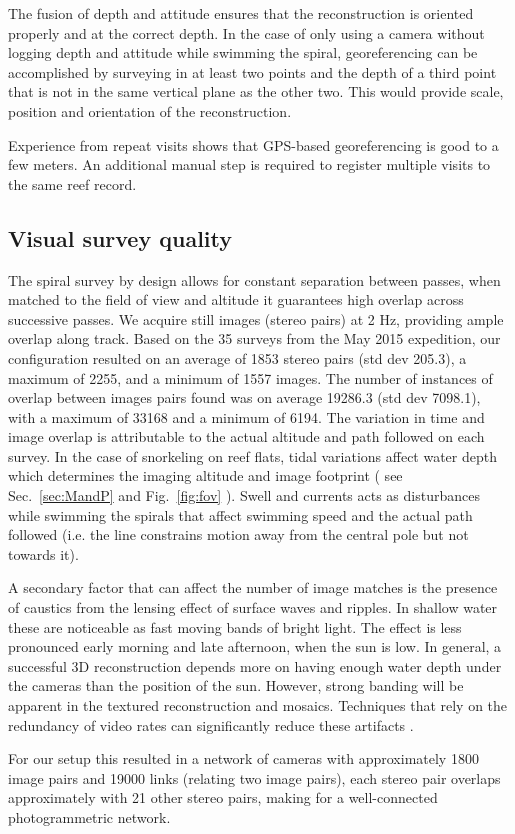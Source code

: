 The fusion of depth and attitude ensures that the reconstruction is oriented properly and at the correct depth. In the case of only using a camera without logging depth and attitude while swimming the spiral, georeferencing can be accomplished by surveying in at least two points and the depth of a third point that is not in the same vertical plane as the other two. This would provide scale, position and orientation of the reconstruction.

Experience from repeat visits shows that GPS-based georeferencing is good to a few meters. An additional manual step is required to register multiple visits to the same reef record.

\subsection{Visual survey quality}
The spiral survey by design allows for constant separation between passes, when matched to the field of view and altitude it guarantees high overlap across successive passes. We acquire still images (stereo pairs) at 2 Hz, providing ample overlap along track. Based on the 35 surveys from the May 2015 expedition, our configuration resulted on an average of 1853 stereo pairs (std dev 205.3), a maximum of 2255, and a minimum of 1557 images. The number of instances of overlap between images pairs found was on average 19286.3 (std dev 7098.1), with a maximum of 33168 and a minimum of 6194. The variation in time and image overlap is attributable to the actual altitude and path followed on each survey. In the case of snorkeling on reef flats, tidal variations affect water depth which determines the imaging altitude and image footprint ( see Sec.~\ref{sec:MandP} and Fig.~\ref{fig:fov} ). Swell and currents acts as disturbances while swimming the spirals that affect swimming speed and the actual path followed (i.e. the line constrains motion away from the central pole but not towards it). 

A secondary factor that can affect the number of image matches is the presence of caustics from the lensing effect of surface waves and ripples. In shallow water these are noticeable as fast moving bands of bright light. The effect is less pronounced early morning and late afternoon, when the sun is low. In general, a successful 3D reconstruction depends more on having enough water depth under the cameras than the position of the sun. However, strong banding will be apparent in the textured reconstruction and mosaics. Techniques that rely on the redundancy of video rates can significantly reduce these artifacts \cite{Gracias_2008}.

For our setup this resulted in a network of cameras with approximately 1800 image pairs and 19000 links (relating two image pairs), each stereo pair overlaps approximately with 21 other stereo pairs, making for a well-connected photogrammetric network.


    
  
  
